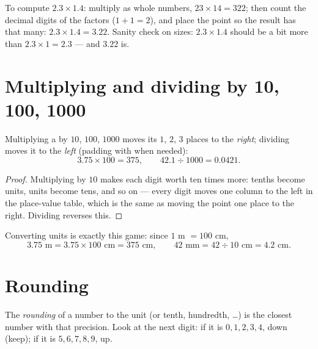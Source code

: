 \begin{example}\label{ex:g6:decimals:mult}
To compute $2.3 \times 1.4$: multiply as whole numbers,
$23 \times 14 = 322$; then count the decimal digits of the factors
($1 + 1 = 2$), and place the point so the result has that many:
$2.3 \times 1.4 = 3.22$. Sanity check on sizes: $2.3 \times 1.4$
should be a bit more than $2.3 \times 1 = 2.3$ --- and $3.22$ is.
\end{example}

\section{Multiplying and dividing by 10, 100, 1000}

\begin{proposition}\label{prop:g6:decimals:shift}
Multiplying a  by $10$, $100$, $1000$ moves its  $1$, $2$, $3$ places to the \emph{right}; dividing moves it to the
\emph{left} (padding with  when needed):
\[
3.75 \times 100 = 375, \qquad
42.1 \div 1000 = 0.0421 .
\]
\end{proposition}

\begin{proof}
Multiplying by $10$ makes each digit worth ten times more: tenths
become units, units become tens, and so on --- every digit moves one
column to the left in the place-value table, which is the same as moving
the point one place to the right. Dividing reverses this.
\end{proof}

\begin{example}\label{ex:g6:decimals:units}
Converting units is exactly this game: since $1$ m $= 100$ cm,
\[
3.75 \text{ m} = 3.75 \times 100 \text{ cm} = 375 \text{ cm},
\qquad
42 \text{ mm} = 42 \div 10 \text{ cm} = 4.2 \text{ cm}.
\]
\end{example}

\section{Rounding}

\begin{definition}[Rounding]\label{def:g6:decimals:rounding}
The \emph{rounding} of a number to the unit (or tenth,
hundredth, \dots) is the closest number with that precision. Look at the
next digit: if it is $0,1,2,3,4$,  down (keep); if it is
$5,6,7,8,9$,  up.
\end{definition}

